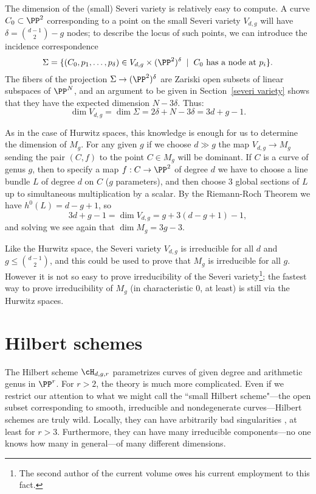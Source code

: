 The dimension of the (small) Severi variety is relatively easy to compute. A curve $C_0 \subset \PP^2$ corresponding to a point on the small Severi variety $V_{d,g}$ will have $\delta = \binom{d-1}{2} - g$ nodes; to describe the locus of such points, we can introduce the incidence correspondence
$$
\Sigma = \{(C_0,p_1,\dots,p_\delta) \in V_{d,g} \times (\PP^2)^\delta \; \mid \; C_0 \text{ has a node at $p_i$} \}.
$$
The fibers of the projection $\Sigma \to (\PP^2)^\delta$ are Zariski open subsets of linear subspaces of $\PP^N$, and an argument to be given in Section~\ref{severi variety} shows that they have the expected dimension $N - 3\delta$. Thus:
$$
\dim V_{d,g} = \dim \Sigma = 2\delta + N - 3\delta = 3d+g-1.
$$

As in the case of Hurwitz spaces, this knowledge is enough for us to determine the dimension of $M_g$. For any given $g$ if we choose $d \gg g$ the map $V_{d,g} \to M_g$ sending the pair $(C, f)$ to the point $C \in M_g$ will be dominant. If $C$ is a curve of genus $g$, then  to specify a map $f : C \to \PP^2$ of degree $d$ we have to choose a line bundle $L$ of degree $d$ on $C$ ($g$ parameters), and then choose 3 global sections of $L$ up to simultaneous multiplication by a scalar. By the Riemann-Roch Theorem we have $h^0(L) = d-g+1$, so
$$
3d+g-1 = \dim V_{d,g}  = g + 3(d-g+1) - 1,
$$
and solving we see again that $\dim M_g = 3g-3$.

Like the Hurwitz space, the Severi variety $V_{d,g}$ is irreducible for all $d$ and $g\leq \binom{d-1}{2}$, and this could be used to prove that $M_g$ is irreducible for all $g$. However it is not so easy to prove irreducibility of the Severi variety\footnote{The second author of the current volume owes his current employment to this fact.}; the fastest way to prove irreducibility of $M_g$ (in characteristic 0, at least) is still via the Hurwitz spaces.

\section{Hilbert schemes}\label{hilbert scheme section}
The Hilbert scheme $\cH_{d,g,r}$ parametrizes curves of given degree and arithmetic genus in $\PP^r$. For $r>2$, the theory is much more complicated.  Even if we restrict our attention to  what we might call the ``small Hilbert scheme"---the open subset corresponding to smooth, irreducible and nondegenerate curves---Hilbert schemes are truly wild. Locally, they can have arbitrarily bad singularities \cite{MR2227692}, at least for $r>3$. Furthermore, they can have many irreducible components---no one knows how many in general---of many different dimensions. 

